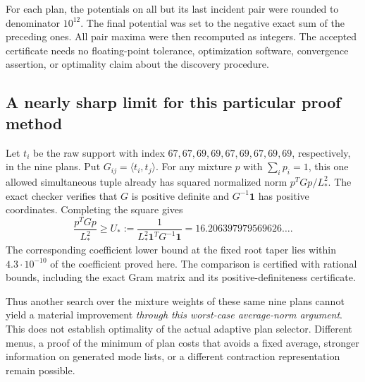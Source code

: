 For each plan, the potentials on all but its last incident pair were
rounded to denominator $10^{12}$. The final potential was set to the
negative exact sum of the preceding ones. All pair maxima were then
recomputed as integers. The accepted certificate needs no floating-point
tolerance, optimization software, convergence assertion, or optimality
claim about the discovery procedure.

\subsection{A nearly sharp limit for this particular proof method}
\label{sec:weight-limit}

Let $t_i$ be the raw support with index $67,67,69,69,67,69,67,69,69$,
respectively, in the nine plans. Put $G_{ij}=\langle t_i,t_j\rangle$.
For any mixture $p$ with $\sum_i p_i=1$, this one allowed simultaneous
tuple already has squared normalized norm $p^TGp/L_*^2$.
The exact checker verifies that $G$ is positive definite and
$G^{-1}\mathbf1$ has positive coordinates. Completing the square gives
\begin{equation}\label{eq:mixture-lower}
 \frac{p^TGp}{L_*^2}
 \ge U_*:=\frac1{L_*^2\mathbf1^TG^{-1}\mathbf1}
 =16.206397979569626\ldots .
\end{equation}
The corresponding coefficient lower bound at the fixed root taper lies
within $4.3\cdot10^{-10}$ of the coefficient proved here. The comparison
is certified with rational bounds, including the exact Gram matrix and
its positive-definiteness certificate.

Thus another search over the mixture weights of these same nine plans
cannot yield a material improvement \emph{through this worst-case
average-norm argument}. This does not establish optimality of the actual
adaptive plan selector. Different menus, a proof of the minimum of plan
costs that avoids a fixed average, stronger information on generated
mode lists, or a different contraction representation remain possible.
